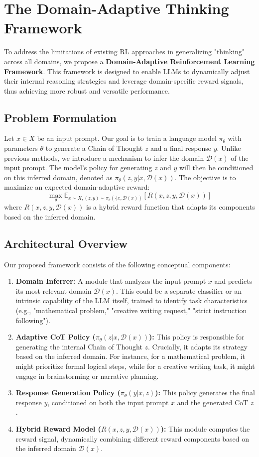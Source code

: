\documentclass{article}
\begin{document}
\section{The Domain-Adaptive Thinking Framework}
\label{sec:framework}
To address the limitations of existing RL approaches in generalizing "thinking" across all domains, we propose a \textbf{Domain-Adaptive Reinforcement Learning Framework}. This framework is designed to enable LLMs to dynamically adjust their internal reasoning strategies and leverage domain-specific reward signals, thus achieving more robust and versatile performance.

\subsection{Problem Formulation}
Let $x \in X$ be an input prompt. Our goal is to train a language model $\pi_\theta$ with parameters $\theta$ to generate a Chain of Thought $z$ and a final response $y$. Unlike previous methods, we introduce a mechanism to infer the domain $\mathcal{D}(x)$ of the input prompt. The model's policy for generating $z$ and $y$ will then be conditioned on this inferred domain, denoted as $\pi_\theta(z, y | x, \mathcal{D}(x))$. The objective is to maximize an expected domain-adaptive reward:
$$ \max_{\theta} \mathbb{E}_{x \sim X, (z, y) \sim \pi_\theta(\cdot|x, \mathcal{D}(x))} \left[ R(x, z, y, \mathcal{D}(x)) \right] $$
where $R(x, z, y, \mathcal{D}(x))$ is a hybrid reward function that adapts its components based on the inferred domain.

\subsection{Architectural Overview}
Our proposed framework consists of the following conceptual components:
\begin{enumerate}
    \item \textbf{Domain Inferrer:} A module that analyzes the input prompt $x$ and predicts its most relevant domain $\mathcal{D}(x)$. This could be a separate classifier or an intrinsic capability of the LLM itself, trained to identify task characteristics (e.g., "mathematical problem," "creative writing request," "strict instruction following").
    \item \textbf{Adaptive CoT Policy ($\pi_\theta(z|x, \mathcal{D}(x))$):} This policy is responsible for generating the internal Chain of Thought $z$. Crucially, it adapts its strategy based on the inferred domain. For instance, for a mathematical problem, it might prioritize formal logical steps, while for a creative writing task, it might engage in brainstorming or narrative planning.
    \item \textbf{Response Generation Policy ($\pi_\theta(y|x, z)$):} This policy generates the final response $y$, conditioned on both the input prompt $x$ and the generated CoT $z$.
    \item \textbf{Hybrid Reward Model ($R(x, z, y, \mathcal{D}(x))$):} This module computes the reward signal, dynamically combining different reward components based on the inferred domain $\mathcal{D}(x)$.
\end{enumerate}
\end{document}
